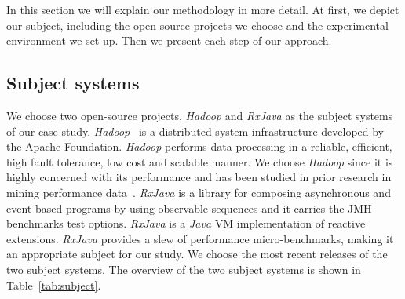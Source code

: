 In this section we will explain our methodology in more detail. At first, we depict our subject, including the open-source projects we choose and the experimental environment we set up. Then we present each step of our approach.

\subsection{Subject systems}

We choose two open-source projects, \emph{Hadoop} and \emph{RxJava} as the subject systems of our case study. \emph{Hadoop}~\cite{hadoop2012:White} is a distributed system infrastructure developed by the Apache Foundation. \emph{Hadoop} performs data processing in a reliable, efficient, high fault tolerance, low cost and scalable manner. We choose \emph{Hadoop} since it is highly concerned with its performance and has been studied in prior research in mining performance data~\cite{markASE}. \emph{RxJava} is a library for composing asynchronous and event-based programs by using observable sequences and it carries the JMH benchmarks test options. \emph{RxJava} is a \emph{Java} VM implementation of reactive extensions. \emph{RxJava} provides a slew of performance micro-benchmarks, making it an appropriate subject for our study. We choose the most recent releases of the two subject systems. The overview of the two subject systems is shown in Table~\ref{tab:subject}. 

